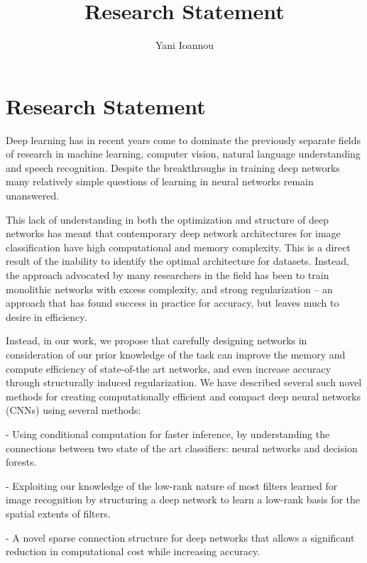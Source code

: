 \documentclass[]{article}
\title{Research Statement}
\author{Yani Ioannou}
\begin{document}
\maketitle



\section{Research Statement}
Deep learning has in recent years come to dominate the previously separate fields of research in machine learning, computer vision, natural language understanding and speech recognition. Despite the breakthroughs in training deep networks many relatively simple questions of learning in neural networks remain unanswered.

This lack of understanding in both the optimization and structure of deep networks has meant that contemporary deep network architectures for image classification have high computational and memory complexity. This is a direct result of the inability to identify the optimal architecture for datasets. Instead, the approach advocated by many researchers in the field has been to train monolithic networks with excess complexity, and strong regularization – an approach that has found success in practice for accuracy, but leaves much to desire in efficiency.

Instead, in our work, we propose that carefully designing networks in consideration of our prior knowledge of the task can improve the memory and compute efficiency of state-of-the art networks, and even increase accuracy through structurally induced regularization. We have described several such novel methods for creating computationally efficient and compact deep neural networks (CNNs) using several methods:

- Using conditional computation for faster inference, by understanding the connections between two state of the art classifiers: neural networks and decision forests.

- Exploiting our knowledge of the low-rank nature of most filters learned for image recognition by structuring a deep network to learn a low-rank basis for the spatial extents of filters.

- A novel sparse connection structure for deep networks that allows a significant reduction in computational cost while increasing accuracy.
\pagebreak
\end{document}
